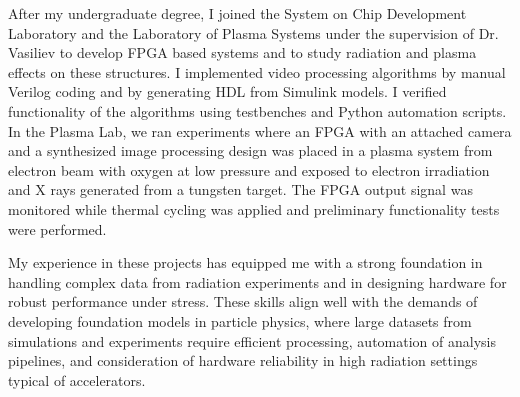 \documentclass[a4paper,12pt]{article}
\begin{document}
\vspace{5pt}

After my undergraduate degree, I joined the System on Chip Development Laboratory and the Laboratory of Plasma Systems under the supervision of Dr. Vasiliev to develop FPGA based systems and to study radiation and plasma effects on these structures. I implemented video processing algorithms by manual Verilog coding and by generating HDL from Simulink models. I verified functionality of the algorithms using testbenches and Python automation scripts. In the Plasma Lab, we ran experiments where an FPGA with an attached camera and a synthesized image processing design was placed in a plasma system from electron beam with oxygen at low pressure and exposed to electron irradiation and X rays generated from a tungsten target. The FPGA output signal was monitored while thermal cycling was applied and preliminary functionality tests were performed.

\vspace{5pt}

My experience in these projects has equipped me with a strong foundation in handling complex data from radiation experiments and in designing hardware for robust performance under stress. These skills align well with the demands of developing foundation models in particle physics, where large datasets from simulations and experiments require efficient processing, automation of analysis pipelines, and consideration of hardware reliability in high radiation settings typical of accelerators.

\vspace{5pt}
\end{document}
